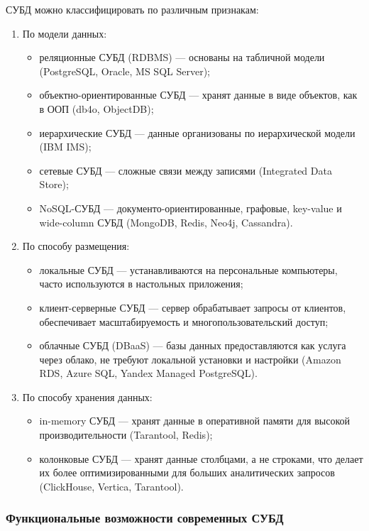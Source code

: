 СУБД можно классифицировать по различным признакам:
\begin{enumerate}
	\item По модели данных:
	\begin{itemize}
		\item реляционные СУБД (RDBMS) — основаны на табличной модели (PostgreSQL, Oracle, MS SQL Server);
		\item объектно-ориентированные СУБД — хранят данные в виде объектов, как в ООП (db4o, ObjectDB);
		\item иерархические СУБД — данные организованы по иерархической модели (IBM IMS);
		\item сетевые СУБД — сложные связи между записями (Integrated Data Store);
		\item NoSQL-СУБД — документо-ориентированные, графовые, key-value и wide-column СУБД (MongoDB, Redis, Neo4j, Cassandra).
	\end{itemize}
	\item По способу размещения:
	\begin{itemize}
		\item локальные СУБД — устанавливаются на персональные компьютеры, часто используются в настольных приложения;
		\item клиент-серверные СУБД — сервер обрабатывает запросы от клиентов, обеспечивает масштабируемость и многопользовательский доступ;
		\item облачные СУБД (DBaaS) — базы данных предоставляются как услуга через облако, не требуют локальной установки и настройки (Amazon RDS, Azure SQL, Yandex Managed PostgreSQL).
	\end{itemize}
	\item По способу хранения данных:
	\begin{itemize}
		\item in-memory СУБД — хранят данные в оперативной памяти для высокой производительности (Tarantool, Redis);
		\item колонковые СУБД — хранят данные столбцами, а не строками, что делает их более оптимизированными для больших аналитических запросов (ClickHouse, Vertica, Tarantool).		
	\end{itemize}
\end{enumerate}

\subsubsection{Функциональные возможности современных СУБД}

